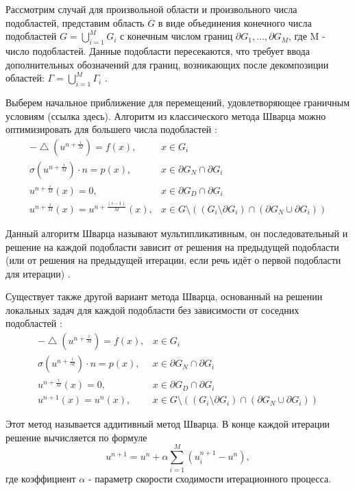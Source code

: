 \documentclass[a4paper, 14pt]{extarticle}
\begin{document}
Рассмотрим случай для произвольной области и произвольного числа подобластей, представим область $G$ в виде объединения конечного числа подобластей $G = \bigcup_{i=1}^{M} G_i$ с конечным числом границ $\partial G_1, \ldots, \partial G_M$, где M - число подобластей. Данные подобласти пересекаются, что требует ввода дополнительных обозначений для границ, возникающих после декомпозиции областей: $\Gamma = \bigcup_{i=1}^{M} \Gamma_i$ \cite{4}. 

Выберем начальное приближение для перемещений, удовлетворяющее граничным условиям (ссылка здесь). Алгоритм из классического метода Шварца можно оптимизировать для большего числа подобластей \cite{5}:
\begin{equation*}
\begin{array}{rl}
-\bigtriangleup \! (u^{n+\frac{i}{M}}) = f(x), & x \in G_i \\
\sigma(u^{n+\frac{i}{M}}) \cdot n = p(x), & x \in \partial G_N \cap \partial G_i \\
u^{n+\frac{i}{M}}(x) = 0, & x \in \partial G_D \cap \partial G_i \\ 
u^{n+\frac{i}{M}}(x) = u^{n+\frac{(i - 1)}{M}}(x), & x \in G \setminus ((G_i \setminus \partial G_i) \cap (\partial G_N \cup \partial G_i))
\end{array}
\end{equation*}

Данный алгоритм Шварца называют мультипликативным, он последовательный и решение на каждой подобласти зависит от решения на предыдущей подобласти (или от решения на предыдущей итерации, если речь идёт о первой подобласти для итерации) \cite{6}.

Существует также другой вариант метода Шварца, основанный на решении локальных задач для каждой подобласти без зависимости от соседних подобластей \cite{7}:
\begin{equation*}
\begin{array}{rl}
-\bigtriangleup \! (u^{n+\frac{i}{M}}) = f(x), & x \in G_i \\
\sigma(u^{n+\frac{i}{M}}) \cdot n = p(x), & x \in \partial G_N \cap \partial G_i \\
u^{n+\frac{i}{M}}(x) = 0, & x \in \partial G_D \cap \partial G_i \\ 
u^{n+1}(x) = u^{n}(x), & x \in G \setminus ((G_i \setminus \partial G_i) \cap (\partial G_N \cup \partial G_i))
\end{array}
\end{equation*}

Этот метод называется аддитивный метод Шварца. В конце каждой итерации решение вычисляется по формуле 
\begin{equation*}
u^{n+1} = u^{n} + \alpha \sum_{i=1}^{M} (u_i^{n+1} - u^{n}),
\end{equation*}
где коэффициент $\alpha$ - параметр скорости сходимости итерационного процесса. 
\end{document}
